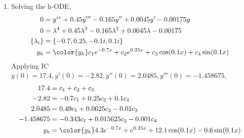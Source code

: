 \begin{enumerate}
    \item Solving the h-ODE,
          \begin{align}
              0               & = y^{iv} + 0.45y''' - 0.165y'' + 0.0045y' - 0.00175y \\
              0               & = \lambda^{4} + 0.45\lambda^{3} - 0.165\lambda^{2}
              + 0.0045\lambda - 0.00175                                              \\
              \{\lambda_{i}\} & = \{-0.7, 0.25, -0.1i, 0.1i\}                        \\
              y_{h}           & = \color{y_h} c_{1}e^{-0.7x} + c_{2}e^{0.25x}
              + c_{3}\cos(0.1x) + c_{4}\sin(0.1x)
          \end{align}
          Applying IC $ y(0) = 17.4, y'(0) = -2.82, y''(0) = 2.0485, y'''(0) = -1.458675 $,
          \begin{align}
              17.4      & = c_{1} + c_{2} + c_{3}                                 \\
              -2.82     & = -0.7c_{1} + 0.25c_{2} + 0.1c_{4}                      \\
              2.0485    & = 0.49c_{1} + 0.0625c_{2} - 0.01c_{3}                   \\
              -1.458675 & = -0.343c_{1} + 0.015625c_{2} - 0.001c_{4}              \\
              y_{h}     & = \color{y_h} 4.3e^{-0.7x} + e^{0.25x} + 12.1\cos(0.1x)
              - 0.6\sin(0.1x)
          \end{align}
          \begin{figure}[H]
              \centering
          \end{figure}


\end{enumerate}
